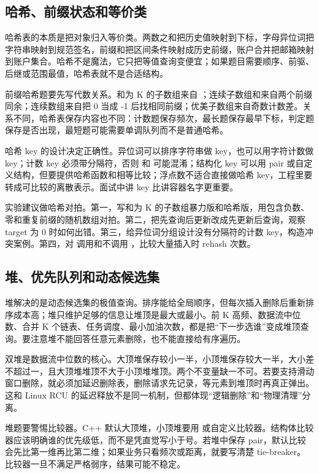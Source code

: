 \subsection{哈希、前缀状态和等价类}

哈希表的本质是把对象归入等价类。两数之和把历史值映射到下标，字母异位词把字符串映射到规范签名，前缀和把区间条件映射成历史前缀，账户合并把邮箱映射到账户集合。哈希不是魔法，它只把等值查询变便宜；如果题目需要顺序、前驱、后继或范围最值，哈希表就不是合适结构。

前缀哈希题要先写代数关系。和为 K 的子数组来自 ；连续子数组和来自两个前缀同余；连续数组来自把 0 当成 -1 后找相同前缀；优美子数组来自奇数计数差。关系不同，哈希表保存内容也不同：计数题保存频次，最长题保存最早下标，判定题保存是否出现，最短题可能需要单调队列而不是普通哈希。

哈希 key 的设计决定正确性。异位词可以排序字符串做 key，也可以用字符计数做 key；计数 key 必须带分隔符，否则  和  可能混淆；结构化 key 可以用 pair 或自定义结构，但要提供哈希函数和相等比较；浮点数不适合直接做哈希 key，工程里要转成可比较的离散表示。面试中讲 key 比讲容器名字更重要。

实验建议做哈希对拍。第一，写和为 K 的子数组暴力版和哈希版，用包含负数、零和重复前缀的随机数组对拍。第二，把先查询后更新改成先更新后查询，观察 target 为 0 时如何出错。第三，给异位词分组设计没有分隔符的计数 key，构造冲突案例。第四，对  调用和不调用 ，比较大量插入时 rehash 次数。

\subsection{堆、优先队列和动态候选集}

堆解决的是动态候选集的极值查询。排序能给全局顺序，但每次插入删除后重新排序成本高；堆只维护足够的信息让堆顶是最大或最小。前 K 高频、数据流中位数、合并 K 个链表、任务调度、最小加油次数，都是把“下一步选谁”变成堆顶查询。要注意堆不能回答任意元素删除，也不能直接给有序遍历。

双堆是数据流中位数的核心。大顶堆保存较小一半，小顶堆保存较大一半，大小差不超过一，且大顶堆堆顶不大于小顶堆堆顶。两个不变量缺一不可。若要支持滑动窗口删除，就必须加延迟删除表，删除请求先记录，等元素到堆顶时再真正弹出。这和 Linux RCU 的延迟释放不是同一机制，但都体现“逻辑删除”和“物理清理”分离。

堆题要警惕比较器。C++  默认大顶堆，小顶堆要用  或自定义比较器。结构体比较器应该明确谁的优先级低，而不是凭直觉写小于号。若堆中保存 pair，默认比较会先比第一维再比第二维；如果业务只看频次或距离，就要写清楚 tie-breaker。比较器一旦不满足严格弱序，结果可能不稳定。

